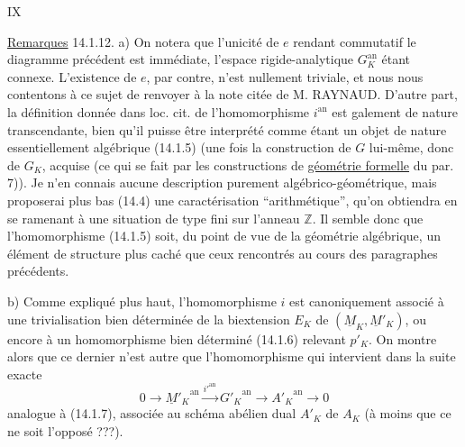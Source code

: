 \hfill IX

\uline{Remarques} 14.1.12. \quad a) On notera que l'unicité de $e$ rendant commutatif le diagramme précédent est immédiate, l'espace rigide-analytique $G_K^{\mathrm{an}}$ étant connexe. L'existence de $e$, par contre, n'est nullement triviale, et nous nous contentons à ce sujet de renvoyer à la note citée de M. RAYNAUD. D'autre part, la définition donnée dans loc. cit. de l'homomorphisme $i^{\mathrm{an}}$ est galement de nature transcendante, bien qu'il puisse être interprété comme étant un objet de nature essentiellement algébrique (14.1.5) (une fois la construction de $G$ lui-même, donc de $G_K$, acquise (ce qui se fait par les constructions de \uline{géométrie formelle} du par. 7)). Je n'en connais aucune description purement algébrico-géométrique, mais proposerai plus bas (14.4) une caractérisation ``arithmétique'', qu'on obtiendra en se ramenant à une situation de type fini sur l'anneau $\mathbb Z$. Il semble donc que l'homomorphisme (14.1.5) soit, du point de vue de la géométrie algébrique, un élément de structure plus caché que ceux rencontrés au cours des paragraphes précédents.

b) Comme expliqué plus haut, l'homomorphisme $i$ est canoniquement associé à une trivialisation bien déterminée de la biextension $E_K$ de $(\underline M_K,\underline M'_K)$, ou encore à un homomorphisme bien déterminé (14.1.6) relevant $p'_K$. On montre alors que ce dernier n'est autre que l'homomorphisme qui intervient dans la suite exacte
\[
 0\longrightarrow{\underline M'_K}^{\mathrm{an}}\xrightarrow{{i'}^{\mathrm{an}}}{G'_K}^{\mathrm{an}}
 \longrightarrow {A'_K}^{\mathrm{an}}\longrightarrow0 \tag*{(14.1.13)}
\]
analogue à (14.1.7), associée au schéma abélien dual $A'_K$ de $A_K$ (à moins que ce ne soit l'opposé ???).


\handwritten{$\unsure{\Omega}$}


